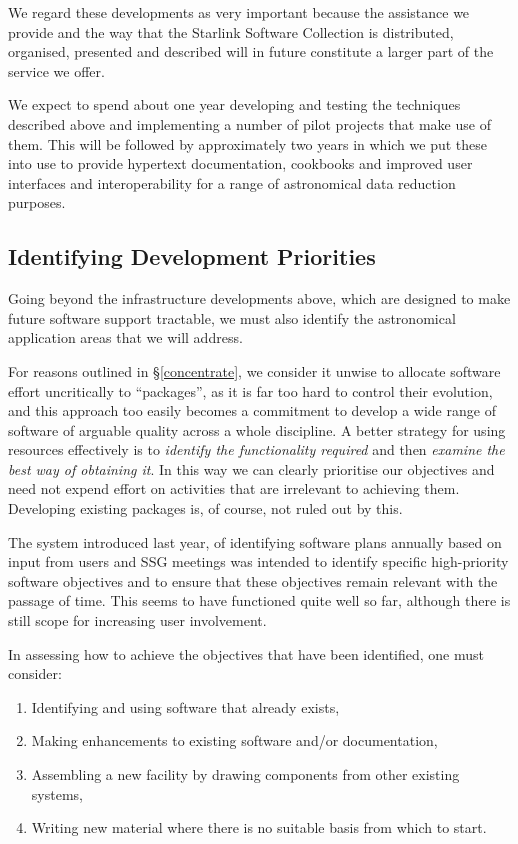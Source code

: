 \documentclass[twoside,11pt]{article}
\newcommand{\xref}[3]{#1}
\newcommand{\qt}[1]{``#1''}
\newcommand{\st}[1]{{\em{#1}}}
\newcommand{\qt}[1]{{\tt{"}}#1{\tt{"}}}
\newcommand{\usscref}[1]{\xref{#1}{sun1}{}}
\begin{document}
We regard these developments as very important because the assistance
we provide and the way that the \usscref{Starlink Software Collection}
is distributed, organised, presented and described will in future
constitute a larger part of the service we offer.

We expect to spend about one year developing and testing the
techniques described above and implementing a number of pilot projects
that make use of them. This will be followed by approximately two
years in which we put these into use to provide hypertext
documentation, cookbooks and improved user interfaces and
interoperability for a range of astronomical data reduction purposes.

\subsection{\label{priority}Identifying Development Priorities}

Going beyond the infrastructure developments above, which are designed
to make future software support tractable, we must also identify the
astronomical application areas that we will address.

For reasons outlined in \S\ref{concentrate}, we consider it unwise to
allocate software effort uncritically to \qt{packages}, as it is far too
hard to control their evolution, and this approach too easily becomes
a commitment to develop a wide range of software of arguable quality
across a whole discipline.  A better strategy for using resources
effectively is to \st{identify the functionality required} and then
\st{examine the best way of obtaining it}. In this way we can clearly
prioritise our objectives and need not expend effort on activities
that are irrelevant to achieving them. Developing existing packages
is, of course, not ruled out by this.

The system introduced last year, of identifying software plans
annually based on input from users and SSG meetings was
intended to identify specific high-priority software objectives and to
ensure that these objectives remain relevant with the passage of time.
This seems to have functioned quite well so far, although there is
still scope for increasing user involvement.

In assessing how to achieve the objectives that have been identified,
one must consider:
\begin{enumerate}
\item Identifying and using software that already exists,

\item Making enhancements to existing software and/or documentation,

\item Assembling a new facility by drawing components from other
existing systems,

\item Writing new material where there is no suitable basis from which
to start.
\end{enumerate}
\end{document}
